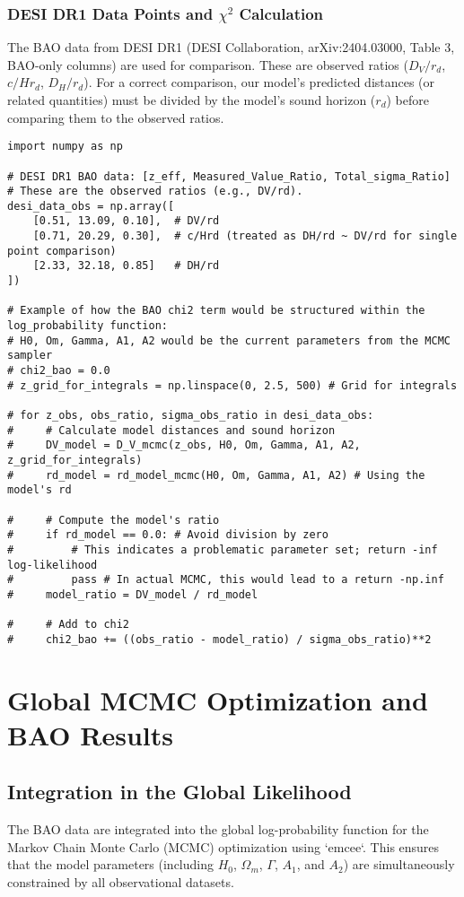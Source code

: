 \documentclass{article}
\begin{document}
\subsubsection{DESI DR1 Data Points and $\chi^2$ Calculation}
The BAO data from DESI DR1 (DESI Collaboration, arXiv:2404.03000, Table 3, BAO-only columns) are used for comparison. These are observed ratios ($D_V/r_d$, $c/H r_d$, $D_H/r_d$). For a correct comparison, our model's predicted distances (or related quantities) must be divided by the model's sound horizon ($r_d$) before comparing them to the observed ratios.

\begin{lstlisting}
import numpy as np

# DESI DR1 BAO data: [z_eff, Measured_Value_Ratio, Total_sigma_Ratio]
# These are the observed ratios (e.g., DV/rd).
desi_data_obs = np.array([
    [0.51, 13.09, 0.10],  # DV/rd
    [0.71, 20.29, 0.30],  # c/Hrd (treated as DH/rd ~ DV/rd for single point comparison)
    [2.33, 32.18, 0.85]   # DH/rd
])

# Example of how the BAO chi2 term would be structured within the log_probability function:
# H0, Om, Gamma, A1, A2 would be the current parameters from the MCMC sampler
# chi2_bao = 0.0
# z_grid_for_integrals = np.linspace(0, 2.5, 500) # Grid for integrals

# for z_obs, obs_ratio, sigma_obs_ratio in desi_data_obs:
#     # Calculate model distances and sound horizon
#     DV_model = D_V_mcmc(z_obs, H0, Om, Gamma, A1, A2, z_grid_for_integrals)
#     rd_model = rd_model_mcmc(H0, Om, Gamma, A1, A2) # Using the model's rd

#     # Compute the model's ratio
#     if rd_model == 0.0: # Avoid division by zero
#         # This indicates a problematic parameter set; return -inf log-likelihood
#         pass # In actual MCMC, this would lead to a return -np.inf
#     model_ratio = DV_model / rd_model

#     # Add to chi2
#     chi2_bao += ((obs_ratio - model_ratio) / sigma_obs_ratio)**2
\end{lstlisting}

\section{Global MCMC Optimization and BAO Results}

\subsection{Integration in the Global Likelihood}
The BAO data are integrated into the global log-probability function for the Markov Chain Monte Carlo (MCMC) optimization using `emcee`. This ensures that the model parameters (including $H_0$, $\Omega_m$, $\Gamma$, $A_1$, and $A_2$) are simultaneously constrained by all observational datasets.
\end{document}
